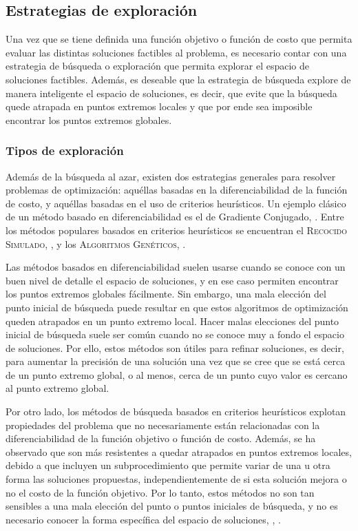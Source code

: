 \subsection{Estrategias de exploración}

Una vez que se tiene definida una función objetivo o función de costo que permita evaluar las distintas soluciones factibles al problema, es necesario contar con una estrategia de búsqueda o exploración que permita explorar el espacio de soluciones factibles. Además, es deseable que la estrategia de búsqueda explore de manera inteligente el espacio de soluciones, es decir, que evite que la búsqueda quede atrapada en puntos extremos locales y que por ende sea imposible encontrar los puntos extremos globales.

\subsubsection{Tipos de exploración}

Además de la búsqueda al azar, existen dos estrategias generales para resolver problemas de optimización: aquéllas basadas en la diferenciabilidad de la función de costo, y aquéllas basadas en el uso de criterios heurísticos.
Un ejemplo clásico de un método basado en diferenciabilidad es el de Gradiente Conjugado, \citeauthor{numrecipesc} \citep{numrecipesc}. Entre los métodos populares basados en criterios heurísticos se encuentran el \textsc{Recocido Simulado}, \citeauthor{Kirkpatrick1983} \citep{Kirkpatrick1983}, y los \textsc{Algoritmos Genéticos}, \citeauthor{Goldberg1989} \citep{Goldberg1989}.

Las métodos basados en diferenciabilidad suelen usarse cuando se conoce con un buen nivel de detalle el espacio de soluciones, y en ese caso permiten encontrar los puntos extremos globales fácilmente. Sin embargo, una mala elección del punto inicial de búsqueda puede resultar en que estos algoritmos de optimización queden atrapados en un punto extremo local. Hacer malas elecciones del punto inicial de búsqueda suele ser común cuando no se conoce muy a fondo el espacio de soluciones. Por ello, estos métodos son útiles para refinar soluciones, es decir, para aumentar la precisión de una solución una vez que se cree que se está cerca de un punto extremo global, o al menos, cerca de un punto cuyo valor es cercano al punto extremo global.

Por otro lado, los métodos de búsqueda basados en criterios heurísticos explotan propiedades del problema que no necesariamente están relacionadas con la diferenciabilidad de la función objetivo o función de costo. Además, se ha observado que son más resistentes a quedar atrapados en puntos extremos locales, debido a que incluyen un subprocedimiento que permite variar de una u otra forma las soluciones propuestas, independientemente de si esta solución mejora o no el costo de la función objetivo. Por lo tanto, estos métodos no son tan sensibles a una mala elección del punto o puntos iniciales de búsqueda, y no es necesario conocer la forma específica del espacio de soluciones, \citeauthor{BangaMoles2003} \citep{BangaMoles2003}, \citeauthor{Storn1997} \citep{Storn1997}.

